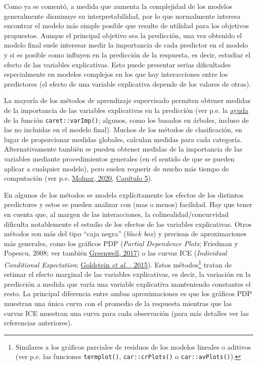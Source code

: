 \documentclass[]{book}
\theoremstyle{break}
\theoremstyle{definition}
\theoremstyle{definition}
\theoremstyle{definition}
\theoremstyle{remark}
\begin{document}
Como ya se comentó, a medida que aumenta la complejidad de los modelos
generalmente disminuye su interpretabilidad, por lo que normalmente
interesa encontrar el modelo más simple posible que resulte de utilidad
para los objetivos propuestos. Aunque el principal objetivo sea la
predicción, una vez obtenido el modelo final suele interesar medir la
importancia de cada predictor en el modelo y si es posible como influyen
en la predicción de la respuesta, es decir, estudiar el efecto de las
variables explicativas. Esto puede presentar serias dificultades
especialmente en modelos complejos en los que hay interacciones entre
los predictores (el efecto de una variable explicativa depende de los
valores de otras).

La mayoría de los métodos de aprendizaje supervisado permiten obtener
medidas de la importancia de las variables explicativas en la predicción
(ver p.e. la
\href{https://topepo.github.io/caret/variable-importance.html}{ayuda} de
la función \texttt{caret::varImp()}; algunos, como los basados en
árboles, incluso de las no incluidas en el modelo final). Muchos de los
métodos de clasificación, en lugar de proporcionar medidas globales,
calculan medidas para cada categoría. Alternativamente también se pueden
obtener medidas de la importancia de las variables mediante
procedimientos generales (en el sentido de que se pueden aplicar a
cualquier modelo), pero suelen requerir de mucho más tiempo de
computación (ver p.e.
\href{https://christophm.github.io/interpretable-ml-book}{Molnar, 2020},
\href{https://christophm.github.io/interpretable-ml-book/agnostic.htm}{Capítulo
5}).

En algunos de los métodos se modela explícitamente los efectos de los
distintos predictores y estos se pueden analizar con (mas o menos)
facilidad. Hay que tener en cuenta que, al margen de las interacciones,
la colinealidad/concurvidad dificulta notablemente el estudio de los
efectos de las variables explicativas. Otros métodos son más del tipo
``caja negra'' (\emph{black box}) y precisan de aproximaciones más
generales, como los gráficos PDP (\emph{Partial Dependence Plots};
Friedman y Popescu, 2008; ver también
\href{https://journal.r-project.org/archive/2017/RJ-2017-016/index.html}{Greenwell,
2017}) o las curvas ICE (\emph{Individual Conditional Expectation};
\href{https://doi.org/10.1080/10618600.2014.907095}{Goldstein \emph{et
al.} , 2015}). Estos métodos\footnote{Similares a los gráficos parciales
  de residuos de los modelos lineales o aditivos (ver p.e. las funciones
  \texttt{termplot()}, \texttt{car::crPlots()} o
  \texttt{car::avPlots()}).} tratan de estimar el efecto marginal de las
variables explicativas, es decir, la variación en la predicción a medida
que varía una variable explicativa manteniendo constantes el resto. La
principal diferencia entre ambas aproximaciones es que los gráficos PDP
muestran una única curva con el promedio de la respuesta mientras que
las curvas ICE muestran una curva para cada observación (para más
detalles ver las referencias anteriores).
\end{document}
